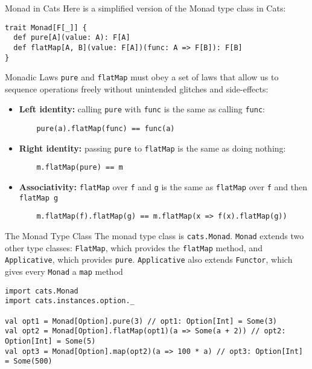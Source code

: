 \documentclass[aspectratio=169]{beamer}
\begin{document}
\begin{frame}[fragile]{Monad in Cats}
Here is a simplified version of the Monad type class in Cats:
\bigskip
\begin{verbatim}
trait Monad[F[_]] {
  def pure[A](value: A): F[A]
  def flatMap[A, B](value: F[A])(func: A => F[B]): F[B]
}
\end{verbatim}
\end{frame}

\begin{frame}[fragile]{Monadic Laws}
\texttt{pure} and \texttt{flatMap} must obey a set of laws that allow us to sequence operations freely without
unintended glitches and side-effects:
\begin{itemize}
  \item \textbf{Left identity:} calling \texttt{pure} with \texttt{func} is the same as calling \texttt{func}:\\
    \begin{verbatim}
    pure(a).flatMap(func) == func(a)
    \end{verbatim}
  \item \textbf{Right identity:} passing \texttt{pure} to \texttt{flatMap} is the same as doing nothing:
    \begin{verbatim}
    m.flatMap(pure) == m
    \end{verbatim}
  \item \textbf{Associativity:} \texttt{flatMap} over \texttt{f} and \texttt{g} is the same as 
    \texttt{flatMap} over \texttt{f} and then \texttt{flatMap g}
    \begin{verbatim}
    m.flatMap(f).flatMap(g) == m.flatMap(x => f(x).flatMap(g))
    \end{verbatim}
\end{itemize}
\end{frame}

\begin{frame}[fragile]{The Monad Type Class}
The monad type class is \texttt{cats.Monad}. \texttt{Monad} extends two other type classes: \texttt{FlatMap}, which provides
the \texttt{flatMap} method, and \texttt{Applicative}, which provides \texttt{pure}.
\texttt{Applicative} also extends \texttt{Functor}, which
gives every \texttt{Monad} a \texttt{map} method
\bigskip
\begin{verbatim}
import cats.Monad
import cats.instances.option._

val opt1 = Monad[Option].pure(3) // opt1: Option[Int] = Some(3)
val opt2 = Monad[Option].flatMap(opt1)(a => Some(a + 2)) // opt2: Option[Int] = Some(5)
val opt3 = Monad[Option].map(opt2)(a => 100 * a) // opt3: Option[Int] = Some(500)
\end{verbatim}
\end{frame}
\end{document}
